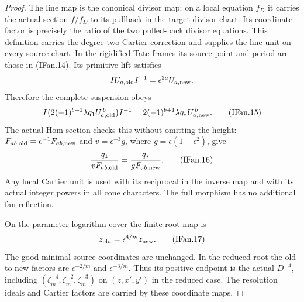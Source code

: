 \begin{proof}
The line map is the canonical divisor map: on a local equation
\(f_D\) it carries the actual section \(f/f_D\) to its pullback in
the target divisor chart. Its coordinate factor is precisely the
ratio of the two pulled-back divisor equations. This definition
carries the degree-two Cartier correction and supplies the line
unit on every source chart. In the rigidified Tate frames its source
point and period are those in (IFan.14). Its primitive lift satisfies
\[
 I U_{a,\rm old} I^{-1}=\epsilon^{2a}U_{a,\rm new}.
\]
Therefore the complete suspension obeys
\[
 I\bigl(2(-1)^{b+1}\lambda q_1U_{a,\rm old}^{\,b}\bigr)I^{-1}
 =2(-1)^{b+1}\lambda q_*U_{a,\rm new}^{\,b}.          \tag{IFan.15}
\]
The actual Hom section checks this without omitting the height:
\(F_{ab,\rm old}=\epsilon^{-1}F_{ab,\rm new}\) and
\(v=\epsilon^{-3}g\), where \(g=\epsilon(1-\epsilon^2)\), give
\[
 \frac{q_1}{vF_{ab,\rm old}}
       =\frac{q_*}{gF_{ab,\rm new}}.                \tag{IFan.16}
\]
Any local Cartier unit is used with its reciprocal in the inverse
map and with its actual integer powers in all cone characters.
The full morphism has no additional fan reflection.

On the parameter logarithm cover the finite-root map is
\[
 z_{\rm old}=\epsilon^{4/m}z_{\rm new}.              \tag{IFan.17}
\]
The good minimal source coordinates are unchanged. In the reduced
root the old-to-new factors are \(\epsilon^{-2/m}\) and
\(\epsilon^{-3/m}\). Thus its positive endpoint is the actual
\(D^{-4}\), including \((\zeta_m^{-4},\zeta_m^{-2},\zeta_m^{-3})\)
on \((z,x',y')\) in the reduced case. The resolution ideals and
Cartier factors are carried by these coordinate maps.


\end{proof}
